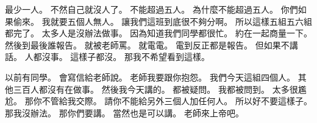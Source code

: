 \hypertarget{c01:cue:1905}{}最少一人。
\hypertarget{c01:cue:1906}{}不然自己就沒人了。
\hypertarget{c01:cue:1907}{}不能超過五人。
\hypertarget{c01:cue:1908}{}為什麼不能超過五人。
\hypertarget{c01:cue:1909}{}你們如果偷來。
\hypertarget{c01:cue:1910}{}我就要五個人無人。
\hypertarget{c01:cue:1911}{}讓我們這班到底很不夠分啊。
\hypertarget{c01:cue:1912}{}所以這樣五組五六組都完了。
\hypertarget{c01:cue:1913}{}太多人是沒辦法做事。
\hypertarget{c01:cue:1914}{}因為知道我們同學都很忙。
\hypertarget{c01:cue:1915}{}約在一起商量一下。
\hypertarget{c01:cue:1916}{}然後到最後誰報告。
\hypertarget{c01:cue:1917}{}就被老師罵。
\hypertarget{c01:cue:1918}{}就電電。
\hypertarget{c01:cue:1919}{}電到反正都是報告。
\hypertarget{c01:cue:1920}{}但如果不講話。
\hypertarget{c01:cue:1921}{}人都沒事。
\hypertarget{c01:cue:1922}{}這樣子都沒。
\hypertarget{c01:cue:1923}{}那我不希望看到這樣。

\hypertarget{c01:cue:1924}{}以前有同學。
\hypertarget{c01:cue:1925}{}會寫信給老師說。
\hypertarget{c01:cue:1926}{}老師我要跟你抱怨。
\hypertarget{c01:cue:1927}{}我們今天這組四個人。
\hypertarget{c01:cue:1928}{}其他三百人都沒有在做事。
\hypertarget{c01:cue:1929}{}然後我今天講的。
\hypertarget{c01:cue:1930}{}都被疑問。
\hypertarget{c01:cue:1931}{}我都被問到。
\hypertarget{c01:cue:1932}{}太多很尷尬。
\hypertarget{c01:cue:1933}{}那你不管給我交際。
\hypertarget{c01:cue:1934}{}請你不能給另外三個人加任何人。
\hypertarget{c01:cue:1935}{}所以好不要這樣子。
\hypertarget{c01:cue:1936}{}那我沒辦法。
\hypertarget{c01:cue:1937}{}那你們要講。
\hypertarget{c01:cue:1938}{}當然也是可以講。
\hypertarget{c01:cue:1939}{}老師來上帝吧。

